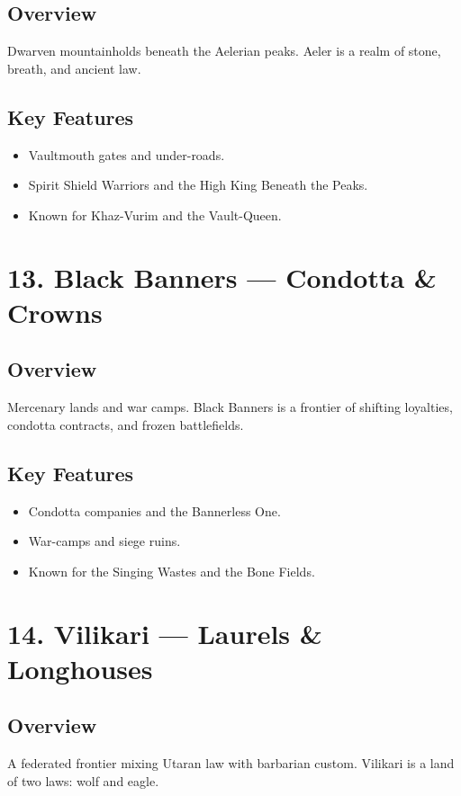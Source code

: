 \documentclass[11pt]{article}
\begin{document}
\subsection*{Overview}
Dwarven mountainholds beneath the Aelerian peaks. Aeler is a realm of stone, breath, and ancient law.

\subsection*{Key Features}
\begin{itemize}[leftmargin=*]
    \item Vaultmouth gates and under-roads.
    \item Spirit Shield Warriors and the High King Beneath the Peaks.
    \item Known for Khaz-Vurim and the Vault-Queen.
\end{itemize}

\section*{13. Black Banners — Condotta \& Crowns}

\subsection*{Overview}
Mercenary lands and war camps. Black Banners is a frontier of shifting loyalties, condotta contracts, and frozen battlefields.

\subsection*{Key Features}
\begin{itemize}[leftmargin=*]
    \item Condotta companies and the Bannerless One.
    \item War-camps and siege ruins.
    \item Known for the Singing Wastes and the Bone Fields.
\end{itemize}

\section*{14. Vilikari — Laurels \& Longhouses}

\subsection*{Overview}
A federated frontier mixing Utaran law with barbarian custom. Vilikari is a land of two laws: wolf and eagle.
\end{document}
